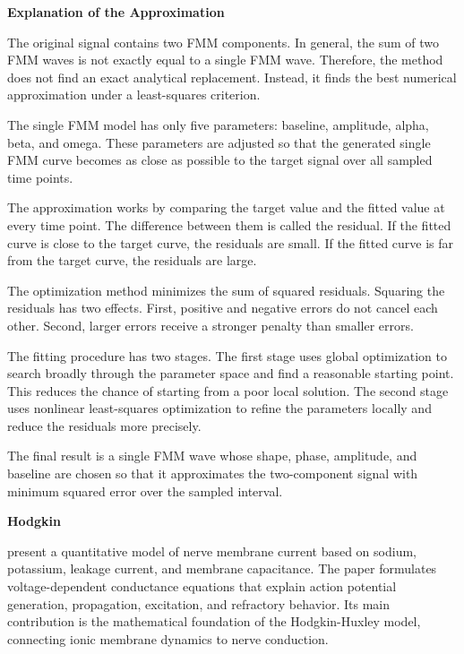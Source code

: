 \documentclass{book}
\providecommand{\ProjectDeepHeading}[2]{%
    \par\medskip\noindent\textbf{#2}\par\smallskip
}
\begin{document}
    
    \ProjectDeepHeading{10}{Explanation of the Approximation}
        
        The original signal contains two FMM components. In general, the sum of two FMM waves is not exactly equal to a single FMM wave. Therefore, the method does not find an exact analytical replacement. Instead, it finds the best numerical approximation under a least-squares criterion.
        
        The single FMM model has only five parameters: baseline, amplitude, alpha, beta, and omega. These parameters are adjusted so that the generated single FMM curve becomes as close as possible to the target signal over all sampled time points.
        
        The approximation works by comparing the target value and the fitted value at every time point. The difference between them is called the residual. If the fitted curve is close to the target curve, the residuals are small. If the fitted curve is far from the target curve, the residuals are large.
        
        The optimization method minimizes the sum of squared residuals. Squaring the residuals has two effects. First, positive and negative errors do not cancel each other. Second, larger errors receive a stronger penalty than smaller errors.
        
        The fitting procedure has two stages. The first stage uses global optimization to search broadly through the parameter space and find a reasonable starting point. This reduces the chance of starting from a poor local solution. The second stage uses nonlinear least-squares optimization to refine the parameters locally and reduce the residuals more precisely.
        
        The final result is a single FMM wave whose shape, phase, amplitude, and baseline are chosen so that it approximates the two-component signal with minimum squared error over the sampled interval.


%        
%

\ProjectDeepHeading{7}{Hodgkin}


\cite{hodgkin-1952-a-quantitative-description-of-membrane-current-and-its-application-to-conduction-and-excitation-in-nerve} present a quantitative model of nerve membrane current based on sodium, potassium, leakage current, and membrane capacitance.
    The paper formulates voltage-dependent conductance equations that explain action potential generation, propagation, excitation, and refractory behavior.
    Its main contribution is the mathematical foundation of the Hodgkin-Huxley model, connecting ionic membrane dynamics to nerve conduction.
\end{document}
